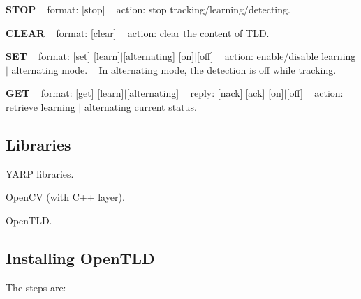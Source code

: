 {\bfseries S\+T\+O\+P} ~\newline
format\+: \mbox{[}stop\mbox{]} ~\newline
 action\+: stop tracking/learning/detecting.

{\bfseries C\+L\+E\+A\+R} ~\newline
format\+: \mbox{[}clear\mbox{]} ~\newline
 action\+: clear the content of T\+L\+D.

{\bfseries S\+E\+T} ~\newline
format\+: \mbox{[}set\mbox{]} \mbox{[}learn\mbox{]}$\vert$\mbox{[}alternating\mbox{]} \mbox{[}on\mbox{]}$\vert$\mbox{[}off\mbox{]} ~\newline
 action\+: enable/disable learning $\vert$ alternating mode. ~\newline
 In alternating mode, the detection is off while tracking.

{\bfseries G\+E\+T} ~\newline
format\+: \mbox{[}get\mbox{]} \mbox{[}learn\mbox{]}$\vert$\mbox{[}alternating\mbox{]} ~\newline
 reply\+: \mbox{[}nack\mbox{]}$\vert$\mbox{[}ack\mbox{]} \mbox{[}on\mbox{]}$\vert$\mbox{[}off\mbox{]} ~\newline
 action\+: retrieve learning $\vert$ alternating current status.\hypertarget{group__icub__tld_lib_sec}{}\subsection{Libraries}\label{group__icub__tld_lib_sec}

\begin{DoxyItemize}
\item Y\+A\+R\+P libraries.
\item Open\+C\+V (with C++ layer).
\item Open\+T\+L\+D.
\end{DoxyItemize}\hypertarget{group__icub__tld_openTLD_sec}{}\subsection{Installing Open\+T\+L\+D}\label{group__icub__tld_openTLD_sec}
The steps are\+: ~\newline

